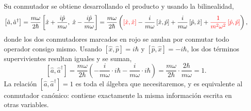         Su conmutador se obtiene desarrollando el producto y usando la bilinealidad,
        \begin{equation}\label{eq:ConmutadorAADaga1}
            \left[\hat{a},\hat{a}^{\dagger}\right] = \frac{m\omega}{2\hbar}\left[\hat{x}+\frac{i\hat{p}}{m\omega},\;\hat{x}-\frac{i\hat{p}}{m\omega}\right]
            = \frac{m\omega}{2\hbar}\left(\textcolor{red}{\left[\hat{x},\hat{x}\right]} - \frac{i}{m\omega}\left[\hat{x},\hat{p}\right] + \frac{i}{m\omega}\left[\hat{p},\hat{x}\right] + \textcolor{red}{\frac{1}{m^{2}\omega^{2}}\left[\hat{p},\hat{p}\right]}\right),
        \end{equation}
        donde los dos conmutadores marcados en rojo se anulan por conmutar todo operador consigo mismo. Usando $[\hat{x},\hat{p}] = i\hbar$ y $[\hat{p},\hat{x}] = -i\hbar$, los dos términos supervivientes resultan iguales y se suman,
        \begin{equation}\label{eq:ConmutadorAADaga2}
            \left[\hat{a},\hat{a}^{\dagger}\right] = \frac{m\omega}{2\hbar}\left(-\frac{i}{m\omega}\cdot i\hbar - \frac{i}{m\omega}\cdot i\hbar\right)
            = \frac{m\omega}{2\hbar}\cdot\frac{2\hbar}{m\omega} = 1 .
        \end{equation}
        La relación $\left[\hat{a},\hat{a}^{\dagger}\right] = 1$ es toda el álgebra que necesitaremos, y es equivalente al conmutador canónico: contiene exactamente la misma información escrita en otras variables.


